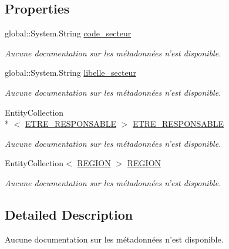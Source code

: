 \subsection*{Properties}
\begin{DoxyCompactItemize}
\item 
global\-::\-System.\-String \hyperlink{class_model_1_1_s_e_c_t_e_u_r_a08444aca8045d7e1ce29ad2d8760807d}{code\-\_\-secteur}
\begin{DoxyCompactList}\small\item\em Aucune documentation sur les métadonnées n'est disponible. \end{DoxyCompactList}\item 
global\-::\-System.\-String \hyperlink{class_model_1_1_s_e_c_t_e_u_r_acd43f9e6cd67fd6018645b7c944fcf40}{libelle\-\_\-secteur}
\begin{DoxyCompactList}\small\item\em Aucune documentation sur les métadonnées n'est disponible. \end{DoxyCompactList}\item 
Entity\-Collection\\*
$<$ \hyperlink{class_model_1_1_e_t_r_e___r_e_s_p_o_n_s_a_b_l_e}{E\-T\-R\-E\-\_\-\-R\-E\-S\-P\-O\-N\-S\-A\-B\-L\-E} $>$ \hyperlink{class_model_1_1_s_e_c_t_e_u_r_a6ae4e9f4e0e89e1fe68995194972a6db}{E\-T\-R\-E\-\_\-\-R\-E\-S\-P\-O\-N\-S\-A\-B\-L\-E}
\begin{DoxyCompactList}\small\item\em Aucune documentation sur les métadonnées n'est disponible. \end{DoxyCompactList}\item 
Entity\-Collection$<$ \hyperlink{class_model_1_1_r_e_g_i_o_n}{R\-E\-G\-I\-O\-N} $>$ \hyperlink{class_model_1_1_s_e_c_t_e_u_r_a10eb57d7aa180eb2757990d77002b00e}{R\-E\-G\-I\-O\-N}
\begin{DoxyCompactList}\small\item\em Aucune documentation sur les métadonnées n'est disponible. \end{DoxyCompactList}\end{DoxyCompactItemize}


\subsection{Detailed Description}
Aucune documentation sur les métadonnées n'est disponible. 



